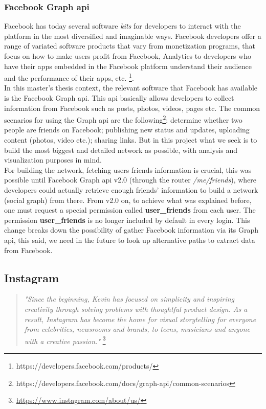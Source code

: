 \subsubsection*{Facebook Graph \gls{api}}
Facebook has today several software \textit{kits} for developers to interact with the platform in the most diversified and imaginable ways. Facebook developers offer a range of variated software products that vary from monetization programs, that focus on how to make users profit from Facebook, Analytics to developers who
have their apps embedded in the Facebook platform understand their audience and the performance of their apps, etc. \footnote{https://developers.facebook.com/products/}.\\
\indent In this master's thesis context, the relevant software that Facebook has available is the Facebook Graph \gls{api}. This \gls{api} basically allows developers to collect information
from Facebook such as posts, photos, videos, pages etc. The common scenarios for using the Graph \gls{api}
are the following\footnote{https://developers.facebook.com/docs/graph-api/common-scenarios}: determine whether two people are friends on Facebook; publishing new status and updates, uploading content (photos, video etc.); sharing links. But in this project what we seek is to build the most biggest and detailed network as possible, with analysis and visualization purposes in mind.\\
\indent For building the network, fetching users friends information is crucial, this was possible until Facebook Graph \gls{api} v2.0 (through the router \textit{/me/friends}), where developers could actually retrieve enough friends' information to build a network (social graph) from there. From v2.0 on, to achieve what was explained before, one must request a special permission called \textbf{user\_friends}
from each user. The permission \textbf{user\_friends} is no longer included by default in every login. This change breaks down the possibility of gather Facebook information via its Graph \gls{api},
this said, we need in the future to look up alternative paths to extract data from Facebook.


\subsection{Instagram}

\begin{quote}
\textit{"Since the beginning, Kevin has focused on simplicity and inspiring creativity through solving problems with thoughtful
product design. As a result, Instagram has become the home for visual storytelling for everyone from celebrities, newsrooms and
brands, to teens, musicians and anyone with a creative passion."} \footnote{\url{https://www.instagram.com/about/us/}}
\end{quote}


